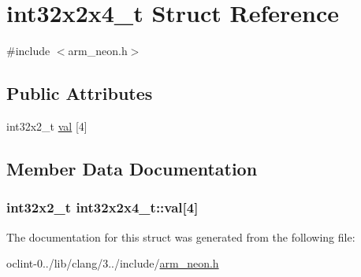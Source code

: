 \hypertarget{structint32x2x4__t}{\section{int32x2x4\-\_\-t Struct Reference}
\label{structint32x2x4__t}
}


{\ttfamily \#include $<$arm\-\_\-neon.\-h$>$}

\subsection*{Public Attributes}
\begin{DoxyCompactItemize}
\item 
int32x2\-\_\-t \hyperlink{structint32x2x4__t_a4e0544aa05cf2822a8d4b83b84df56ca}{val} \mbox{[}4\mbox{]}
\end{DoxyCompactItemize}


\subsection{Member Data Documentation}
\hypertarget{structint32x2x4__t_a4e0544aa05cf2822a8d4b83b84df56ca}{
\subsubsection[{val}]{\setlength{\rightskip}{0pt plus 5cm}int32x2\-\_\-t int32x2x4\-\_\-t\-::val\mbox{[}4\mbox{]}}}\label{structint32x2x4__t_a4e0544aa05cf2822a8d4b83b84df56ca}


The documentation for this struct was generated from the following file\-:\begin{DoxyCompactItemize}
\item 
oclint-\/0../lib/clang/3../include/\hyperlink{arm__neon_8h}{arm\-\_\-neon.\-h}\end{DoxyCompactItemize}
